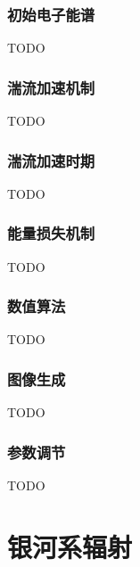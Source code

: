\subsubsection{初始电子能谱}

TODO

\subsubsection{湍流加速机制}

TODO

\subsubsection{湍流加速时期}

TODO

\subsubsection{能量损失机制}

TODO

\subsubsection{数值算法}

TODO

\subsubsection{图像生成}

TODO

\subsubsection{参数调节}

TODO


\section{银河系辐射}

